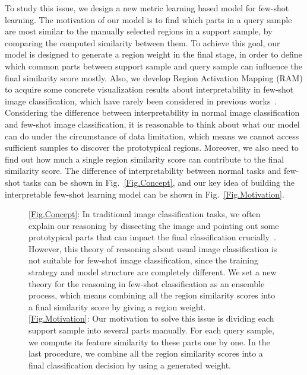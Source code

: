 \documentclass[letterpaper]{article}
\begin{document}
To study this issue, we design a new metric learning based model for few-shot learning. The motivation of our model is to find which parts in a query sample are most similar to the manually selected regions in a support sample, by comparing the computed similarity between them. To achieve this goal, our model is designed to generate a region weight in the final stage, in order to define which common parts between support sample and query sample can influence the final similarity score mostly. Also, we develop Region Activation Mapping (RAM) to acquire some concrete visualization results about interpretability in few-shot image classification, which have rarely been considered in previous works~\cite{satorras2018few,santoro2016meta}. Considering the difference between interpretability in normal image classification and few-shot image classification, it is reasonable to think about what our model can do under the circumstance of data limitation, which means we cannot access sufficient samples to discover the prototypical regions.  Moreover, we also need to find out how much a single region similarity score can contribute to the final similarity score. The difference of interpretability between normal tasks and few-shot tasks can be shown in Fig.~\ref{Fig.Concept}, and our key idea of building the interpretable few-shot learning model can be shown in Fig.~\ref{Fig.Motivation}.
\begin{figure*}[t]
\centering 
{}
\caption{\ref{Fig.Concept}: 
In traditional image classification tasks, we often explain our reasoning by dissecting the image and pointing out some prototypical parts that can impact the final classification crucially~\cite{Chen2018ThisLL}. However, this theory of reasoning about usual image classification is not suitable for few-shot image classification, since the training strategy and model structure are completely different. We set a new theory for the reasoning in few-shot classification as an ensemble process, which means combining all the region similarity scores into a final similarity score by giving a region weight.\\
\ref{Fig.Motivation}: Our motivation to solve this issue is dividing each support sample into several parts manually. For each query sample, we compute its feature similarity to these parts one by one. In the last procedure, we combine all the region similarity scores into a final classification decision by using a generated weight.}
\end{figure*}
\end{document}
